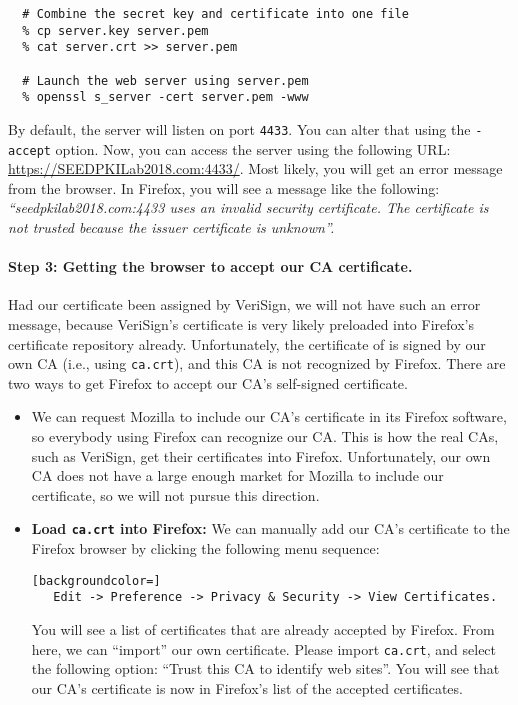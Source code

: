 \begin{lstlisting}
  # Combine the secret key and certificate into one file
  % cp server.key server.pem
  % cat server.crt >> server.pem
 
  # Launch the web server using server.pem
  % openssl s_server -cert server.pem -www
\end{lstlisting}

By default, the server will listen on port {\tt 4433}. You can alter that using 
the {\tt -accept} option. Now, you can access the server using the following
URL: \url{https://SEEDPKILab2018.com:4433/}.
Most likely, you will get an error message from the browser. In Firefox, you will
see a message like the following:
{\em ``seedpkilab2018.com:4433 uses an invalid security certificate.
The certificate is not trusted because the issuer certificate is unknown''.}


\paragraph{Step 3: Getting the browser to accept our CA certificate.}
Had our certificate been assigned by VeriSign, we will not have such an error
message, because VeriSign's certificate is very likely preloaded into
Firefox's certificate repository already. Unfortunately, the 
certificate of \pkiserver is signed by our own CA (i.e., using 
{\tt ca.crt}), and this CA is not recognized by Firefox. There are two ways to
get Firefox to accept our CA's self-signed certificate. 

\begin{itemize}

\item We can request Mozilla to include our CA's certificate in its Firefox software, so
everybody using Firefox can recognize our CA.  This is how the real CAs, such as VeriSign, get
their certificates into Firefox. Unfortunately, our own CA does not have a large enough market
for Mozilla to include our certificate, so we will not pursue this direction.

\item {\bf Load {\tt ca.crt} into Firefox:} We can manually add our CA's certificate to the
Firefox browser by clicking the following menu sequence:

\begin{lstlisting}[backgroundcolor=]
   Edit -> Preference -> Privacy & Security -> View Certificates.
\end{lstlisting}

You will see a list of certificates that are already accepted by Firefox. From here, we 
can ``import'' our own certificate. Please import {\tt ca.crt}, and select the
following option: ``Trust this CA to identify web sites''.  You will see that 
our CA's certificate is now in Firefox's list of the accepted certificates.
\end{itemize}


